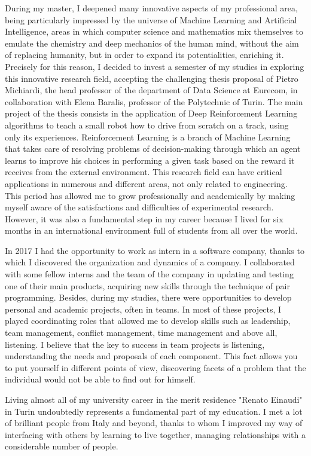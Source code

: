 \documentclass[11pt, a4paper]{awesome-cv}
\begin{document}
\begin{cvletter}
During my master, I deepened many innovative aspects of my professional area, being particularly impressed by the universe of Machine Learning and Artificial Intelligence, areas in which computer science and mathematics mix themselves to emulate the chemistry and deep mechanics of the human mind, without the aim of replacing humanity, but in order to expand its potentialities, enriching it.
Precisely for this reason, I decided to invest a semester of my studies in exploring this innovative research field, accepting the challenging thesis proposal of Pietro Michiardi, the head professor of the department of Data Science at Eurecom, in collaboration with Elena Baralis, professor of the Polytechnic of Turin.
The main project of the thesis consists in the application of Deep Reinforcement Learning algorithms to teach a small robot how to drive from scratch on a track, using only its experiences. Reinforcement Learning is a branch of Machine Learning that takes care of resolving problems of decision-making through which an agent learns to improve his choices in performing a given task based on the reward it receives from the external environment. This research field can have critical applications in numerous and different areas, not only related to engineering. 
This period has allowed me to grow professionally and academically by making myself aware of the satisfactions and difficulties of experimental research. However, it was also a fundamental step in my career because I lived for six months in an international environment full of students from all over the world.

In 2017 I had the opportunity to work as intern in a software company, thanks to which I discovered the organization and dynamics of a company. I collaborated with some fellow interns and the team of the company in updating and testing one of their main products, acquiring new skills through the technique of pair programming.
Besides, during my studies, there were opportunities to develop personal and academic projects, often in teams. In most of these projects, I played coordinating roles that allowed me to develop skills such as leadership, team management, conflict management, time management and above all, listening. I believe that the key to success in team projects is listening, understanding the needs and proposals of each component. This fact allows you to put yourself in different points of view, discovering facets of a problem that the individual would not be able to find out for himself.

Living almost all of my university career in the merit residence "Renato Einaudi" in Turin undoubtedly represents a fundamental part of my education. I met a lot of brilliant people from Italy and beyond, thanks to whom I improved my way of interfacing with others by learning to live together, managing relationships with a considerable number of people.


\end{cvletter}
\end{document}
